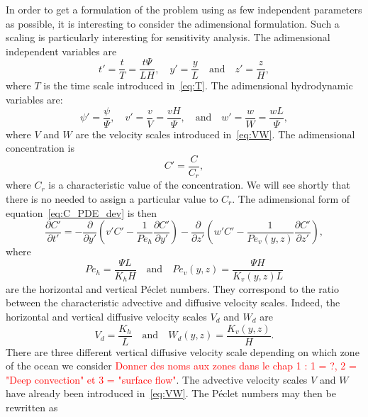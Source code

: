 In order to get a formulation of the problem using as few independent parameters as possible, it is interesting to consider the adimensional formulation. Such a scaling is particularly interesting for sensitivity analysis. The adimensional independent variables are
\begin{equation}
	t' = \frac{t}{T} = \frac{t\Psi}{LH}, \quad y' = \frac{y}{L} \quad \mbox{and} \quad z' = \frac{z}{H},   	
\end{equation}
where $T$ is the time scale introduced in~\eqref{eq:T}. The adimensional hydrodynamic variables are:
\begin{equation}
	\psi' = \frac{\psi}{\Psi}, \quad v' = \frac{v}{V} = \frac{vH}{\Psi}, \quad \mbox{and} \quad w' = \frac{w}{W} = \frac{wL}{\Psi},
\end{equation}
where $V$ and $W$ are the velocity scales introduced in~\eqref{eq:VW}. The adimensional concentration is
\begin{equation}
	C' = \frac{C}{C_r}, 	
\end{equation}
where $C_r$ is a characteristic value of the concentration. We will see shortly that there is no needed to assign a particular value to $C_r$. The adimensional form of equation~\eqref{eq:C_PDE_dev} is then
\begin{equation}\label{eq:PDE_adim}
	\frac{\partial C'}{\partial t'} = -\frac{\partial}{\partial y'}\left(v'C' - \frac{1}{Pe_h}\frac{\partial C'}{\partial y'}\right) -\frac{\partial}{\partial z'}\left(w'C' - \frac{1}{Pe_v(y,z)}\frac{\partial C'}{\partial z'}\right),
\end{equation}
where
\begin{equation}
	Pe_h = \frac{\Psi L}{K_h H} \quad \mbox{and} \quad Pe_v(y,z) = \frac{\Psi H}{K_v(y,z)L}
\end{equation}
are the horizontal and vertical Péclet numbers. They correspond to the ratio between the characteristic advective and diffusive velocity scales. Indeed, the horizontal and vertical diffusive velocity scales $V_{d}$ and $W_{d}$ are 
\begin{equation}
	V_{d} = \frac{K_h}{L} \quad \mbox{and} \quad W_{d}(y,z) = \frac{K_v(y,z)}{H}.
\end{equation}
There are three different vertical diffusive velocity scale depending on which zone of the ocean we consider \textcolor{red}{Donner des noms aux zones dans le chap 1 : 1 = ?, 2 = "Deep convection" et 3 = "surface flow"}. The advective velocity scales $V$ and $W$ have already been introduced in~\eqref{eq:VW}. The Péclet numbers may then be rewritten as

